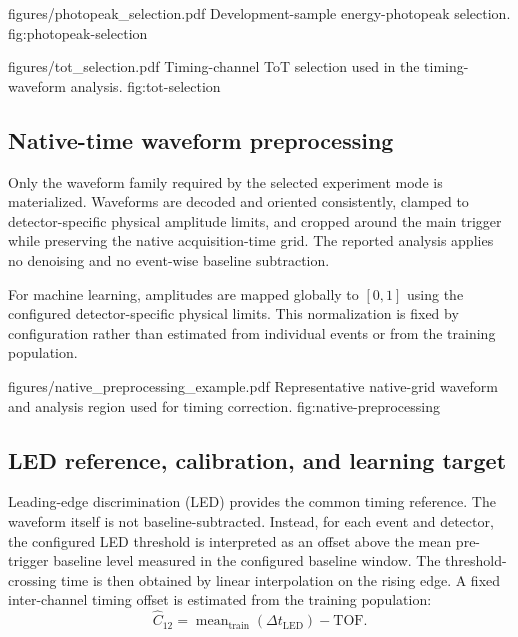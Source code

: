 

\reportfigure
    {figures/photopeak_selection.pdf}
    {Development-sample energy-photopeak selection.}
    {fig:photopeak-selection}

\reportfigure
    {figures/tot_selection.pdf}
    {Timing-channel ToT selection used in the timing-waveform analysis.}
    {fig:tot-selection}

\subsection{Native-time waveform preprocessing}

Only the waveform family required by the selected experiment mode is materialized. Waveforms are decoded and oriented consistently, clamped to detector-specific physical amplitude limits, and cropped around the main trigger while preserving the native acquisition-time grid. The reported analysis applies no denoising and no event-wise baseline subtraction.

For machine learning, amplitudes are mapped globally to \([0,1]\) using the configured detector-specific physical limits. This normalization is fixed by configuration rather than estimated from individual events or from the training population.

\reportfigure
    {figures/native_preprocessing_example.pdf}
    {Representative native-grid waveform and analysis region used for timing correction.}
    {fig:native-preprocessing}

\subsection{LED reference, calibration, and learning target}

Leading-edge discrimination (LED) provides the common timing reference. The waveform itself is not baseline-subtracted. Instead, for each event and detector, the configured LED threshold is interpreted as an offset above the mean pre-trigger baseline level measured in the configured baseline window. The threshold-crossing time is then obtained by linear interpolation on the rising edge. A fixed inter-channel timing offset is estimated from the training population:
\begin{equation}
    \widehat{C}_{12}
    =
    \operatorname{mean}_{\mathrm{train}}\!\left(\Delta t_{\mathrm{LED}}\right)
    -
    \mathrm{TOF}.
\end{equation}

